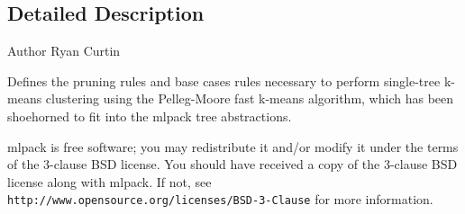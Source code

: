 \subsection{Detailed Description}
\begin{DoxyAuthor}{Author}
Ryan Curtin
\end{DoxyAuthor}
Defines the pruning rules and base cases rules necessary to perform single-\/tree k-\/means clustering using the Pelleg-\/\+Moore fast k-\/means algorithm, which has been shoehorned to fit into the mlpack tree abstractions.

mlpack is free software; you may redistribute it and/or modify it under the terms of the 3-\/clause B\+SD license. You should have received a copy of the 3-\/clause B\+SD license along with mlpack. If not, see {\tt http\+://www.\+opensource.\+org/licenses/\+B\+S\+D-\/3-\/\+Clause} for more information. 
